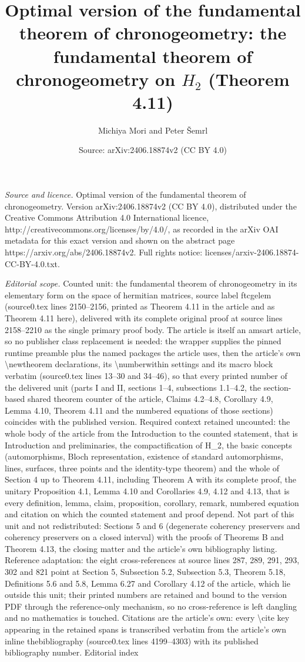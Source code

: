 \documentclass[10pt,a4paper]{amsart}
\title[Optimal version of the fundamental theorem of chronogeometry]{Optimal version of the fundamental theorem of chronogeometry: the fundamental theorem of chronogeometry on $H_2$ (Theorem 4.11)}
\author{Michiya Mori and Peter \v{S}emrl}
\date{Source: arXiv:2406.18874v2 (CC BY 4.0)}
\theoremstyle{definition}
\theoremstyle{remark}
\numberwithin{subsection}{section}
\numberwithin{equation}{section}
\begin{document}
\maketitle
\noindent\emph{Source and licence.} Optimal version of the fundamental theorem of chronogeometry. Version arXiv:2406.18874v2 (CC BY 4.0), distributed under the Creative Commons Attribution 4.0 International licence, http://creativecommons.org/licenses/by/4.0/, as recorded in the arXiv OAI metadata for this exact version and shown on the abstract page https://arxiv.org/abs/2406.18874v2. Full rights notice: licenses/arxiv-2406.18874-CC-BY-4.0.txt.\par\smallskip
\noindent\textit{Editorial scope.} Counted unit: the fundamental theorem of chronogeometry in its elementary form on the space of hermitian matrices, source label ftcgelem (source0.tex lines 2150--2156, printed as Theorem 4.11 in the article and as Theorem 4.11 here), delivered with its complete original proof at source lines 2158--2210 as the single primary proof body. The article is itself an amsart article, so no publisher class replacement is needed: the wrapper supplies the pinned runtime preamble plus the named packages the article uses, then the article's own \textbackslash{}newtheorem declarations, its \textbackslash{}numberwithin settings and its macro block verbatim (source0.tex lines 13--30 and 34--46), so that every printed number of the delivered unit (parts I and II, sections 1--4, subsections 1.1--4.2, the section-based shared theorem counter of the article, Claims 4.2--4.8, Corollary 4.9, Lemma 4.10, Theorem 4.11 and the numbered equations of those sections) coincides with the published version. Required context retained uncounted: the whole body of the article from the Introduction to the counted statement, that is Introduction and preliminaries, the compactification of H\_2, the basic concepts (automorphisms, Bloch representation, existence of standard automorphisms, lines, surfaces, three points and the identity-type theorem) and the whole of Section 4 up to Theorem 4.11, including Theorem A with its complete proof, the unitary Proposition 4.1, Lemma 4.10 and Corollaries 4.9, 4.12 and 4.13, that is every definition, lemma, claim, proposition, corollary, remark, numbered equation and citation on which the counted statement and proof depend. Not part of this unit and not redistributed: Sections 5 and 6 (degenerate coherency preservers and coherency preservers on a closed interval) with the proofs of Theorems B and Theorem 4.13, the closing matter and the article's own bibliography listing. Reference adaptation: the eight cross-references at source lines 287, 289, 291, 293, 302 and 821 point at Section 5, Subsection 5.2, Subsection 5.3, Theorem 5.18, Definitions 5.6 and 5.8, Lemma 6.27 and Corollary 4.12 of the article, which lie outside this unit; their printed numbers are retained and bound to the version PDF through the reference-only mechanism, so no cross-reference is left dangling and no mathematics is touched. Citations are the article's own: every \textbackslash{}cite key appearing in the retained spans is transcribed verbatim from the article's own inline thebibliography (source0.tex lines 4199--4303) with its published bibliography number. Editorial index 
\end{document}
